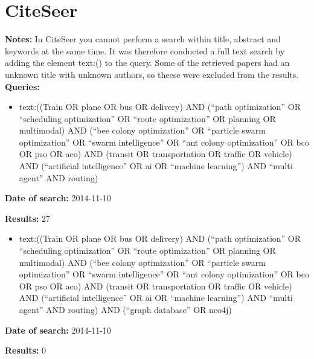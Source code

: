 \section{CiteSeer}
\textbf{Notes:} In CiteSeer you cannot perform a search within title, abstract and keywords at the same time. It was therefore conducted a full text search by adding the element text:() to the query.  Some of the retrieved papers had an unknown title with unknown authors, so theese were excluded from the results. 
\newline
\newline
\textbf{Queries:}
\begin{itemize}
\item text:((Train OR plane OR bus OR delivery) AND (``path optimization'' OR ``scheduling optimization'' OR ``route optimization'' OR planning OR multimodal) AND (``bee colony optimization'' OR ``particle swarm optimization'' OR ``swarm intelligence'' OR ``ant colony optimization'' OR bco OR pso OR aco) AND (transit OR transportation OR traffic OR vehicle) AND (``artificial intelligence'' OR ai OR ``machine learning'') AND ``multi agent'' AND routing)
\end{itemize}
\par \textbf{Date of search:} 2014-11-10 
\par \textbf{Results:} 27
\begin{itemize}
\item text:((Train OR plane OR bus OR delivery) AND (``path optimization'' OR ``scheduling optimization'' OR ``route optimization'' OR planning OR multimodal) AND (``bee colony optimization'' OR ``particle swarm optimization'' OR ``swarm intelligence'' OR ``ant colony optimization'' OR bco OR pso OR aco) AND (transit OR transportation OR traffic OR vehicle) AND (``artificial intelligence'' OR ai OR ``machine learning'') AND ``multi agent'' AND routing) AND (``graph database'' OR neo4j)
\end{itemize}
\par \textbf{Date of search:} 2014-11-10 
\par \textbf{Results:} 0
 

